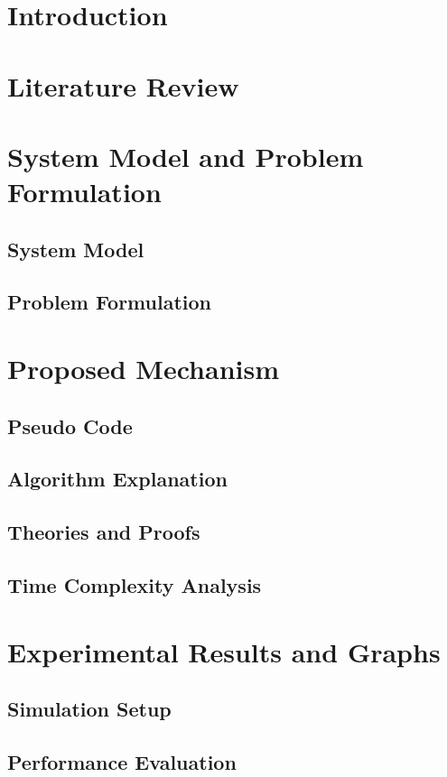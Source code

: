 \documentclass[12pt,a4paper]{report}
\begin{document}
\chapter{Introduction}

\chapter{Literature Review}

\chapter{System Model and Problem Formulation}
\section{System Model}
\section{Problem Formulation}

\chapter{Proposed Mechanism}
\section{Pseudo Code}
\section{Algorithm Explanation}
\section{Theories and Proofs}
\section{Time Complexity Analysis}

\chapter{Experimental Results and Graphs}
\section{Simulation Setup}
\section{Performance Evaluation}
\end{document}
